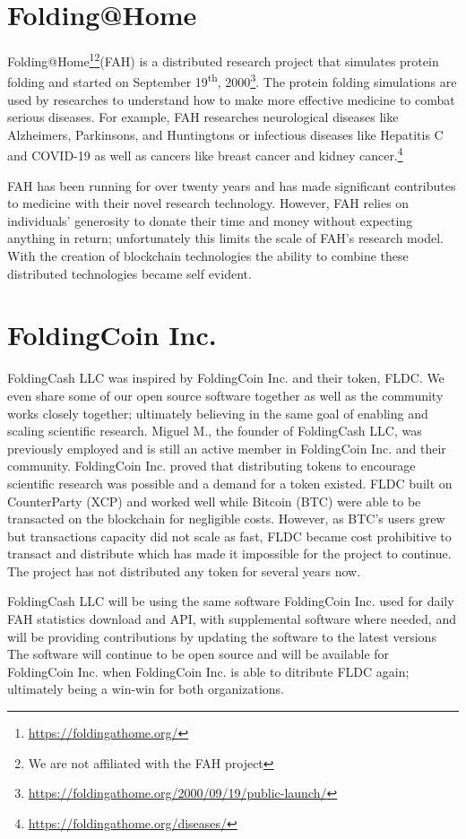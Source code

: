 \documentclass[letterpaper,12pt,titlepage]{article}
\def\org{FoldingCash LLC}
\def\fahWebsite{\url{https://foldingathome.org/}}
\def\fahLaunchDate{September 19\textsuperscript{th}, 2000}
\def\fahLaunchReference{\url{https://foldingathome.org/2000/09/19/public-launch/}}
\def\fahDiseasesReference{\url{https://foldingathome.org/diseases/}}
\begin{document}
\section{Folding@Home}
Folding@Home\footnote{\fahWebsite}\footnote{We are not affiliated with the FAH project}(FAH) is a distributed research project that simulates protein folding and started on \fahLaunchDate\footnote{\fahLaunchReference}. The protein folding simulations are used by researches to understand how to make more effective medicine to combat serious diseases. For example, FAH researches neurological diseases like Alzheimers, Parkinsons, and Huntingtons or infectious diseases like Hepatitis C and COVID-19 as well as cancers like breast cancer and kidney cancer.\footnote{\fahDiseasesReference}

FAH has been running for over twenty years and has made significant contributes to medicine with their novel research technology. However, FAH relies on individuals' generosity to donate their time and money without expecting anything in return; unfortunately this limits the scale of FAH's research model. With the creation of blockchain technologies the ability to combine these distributed technologies became self evident.

\section{FoldingCoin Inc.}
\org{} was inspired by FoldingCoin Inc. and their token, FLDC. We even share some of our open source software together as well as the community works closely together; ultimately believing in the same goal of enabling and scaling scientific research. Miguel M., the founder of \org{}, was previously employed and is still an active member in FoldingCoin Inc. and their community. FoldingCoin Inc. proved that distributing tokens to encourage scientific research was possible and a demand for a token existed. FLDC built on CounterParty (XCP) and worked well while Bitcoin (BTC) were able to be transacted on the blockchain for negligible costs. However, as BTC's users grew but transactions capacity did not scale as fast, FLDC became cost prohibitive to transact and distribute which has made it impossible for the project to continue. The project has not distributed any token for several years now.

\org{} will be using the same software FoldingCoin Inc. used for daily FAH statistics download and API, with supplemental software where needed, and will be providing contributions by updating the software to the latest versions  The software will continue to be open source and will be available for FoldingCoin Inc. when FoldingCoin Inc. is able to ditribute FLDC again; ultimately being a win-win for both organizations.
\end{document}
